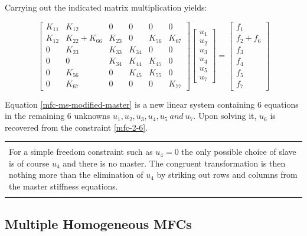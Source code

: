 \documentclass[10pt,b5paper,titlepage]{book}
\newenvironment{bbox}[1][0.96]
{
    \begin{center}
        \begin{tabular}{|p{#1\textwidth}|}
            \hline\\
}
{
            \\\\\hline
        \end{tabular}
    \end{center}
}
\begin{document}
Carrying out the indicated matrix multiplication yields:

\begin{equation}\label{mfc-ms-modified-master}
    \begin{bmatrix}
        K_{11} & K_{12} & 0 & 0 & 0 & 0 \\
        K_{12} & K_{22} + K_{66} & K_{23} & 0 & K_{56} & K_{67} \\
        0 & K_{23} & K_{33} & K_{34} & 0 & 0 \\
        0 & 0 & K_{34} & K_{44} & K_{45} & 0 \\
        0 & K_{56} & 0 & K_{45} & K_{55} & 0 \\
        0 & K_{67} & 0 & 0 & 0 & K_{77}
    \end{bmatrix}
    \begin{bmatrix}
        u_1 \\
        u_2 \\
        u_3 \\
        u_4 \\
        u_5 \\
        u_7
    \end{bmatrix}
    = \begin{bmatrix}
        f_1 \\
        f_2 + f_6 \\
        f_3 \\
        f_4 \\
        f_5 \\
        f_7
    \end{bmatrix}
\end{equation}

Equation \eqref{mfc-ms-modified-master} is a new linear system containing 6 equations
in the remaining 6 unknowns $ u_1, u_2, u_3, u_4, u_5\ and\ u_7 $. Upon
solving it, $ u_6 $ is recovered from the constraint \eqref{mfc-2-6}.

\begin{bbox}
    For a simple freedom constraint such as $ u_4 = 0 $ the only possible choice of slave
    is of course $ u_4 $ and there is no master. The congruent transformation is then
    nothing more than the elimination of $ u_4 $ by striking out rows and columns from
    the master stiffness equations.
\end{bbox}


\subsection{Multiple Homogeneous MFCs}
\end{document}
